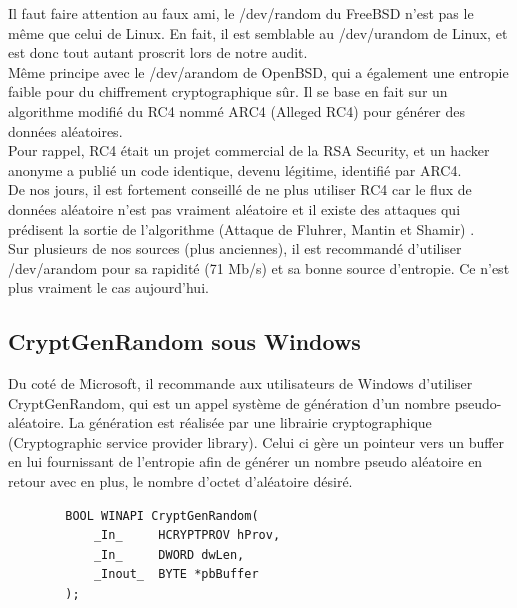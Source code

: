 		Il faut faire attention au faux ami, le /dev/random du FreeBSD n'est pas 
		le même que celui de Linux.
		En fait, il est semblable au /dev/urandom de Linux, et est donc tout 
		autant proscrit lors de notre audit.\\
		
		Même principe avec le /dev/arandom de OpenBSD, qui a également une 
		entropie faible pour du chiffrement cryptographique sûr. Il se base
		en fait sur un algorithme modifié du RC4 nommé ARC4 (Alleged RC4) pour 
		générer des données aléatoires.\\
		Pour rappel, RC4 était un projet commercial de la RSA Security, et un 
		hacker anonyme a publié un code identique, devenu légitime, identifié par
		ARC4.\\
		De nos jours, il est fortement conseillé de ne plus utiliser RC4 car le 
		flux de données aléatoire n’est pas vraiment aléatoire et il existe des 
		attaques qui prédisent la sortie de l’algorithme (Attaque de Fluhrer, 
		Mantin et Shamir) \cite{fmsrc42009}.\\
		Sur plusieurs de nos sources (plus anciennes), il est recommandé
		d'utiliser /dev/arandom pour sa rapidité (71 Mb/s) et sa bonne source
		d'entropie. Ce n'est plus vraiment le cas aujourd'hui.\\
		
		
		
	
	\subsection{CryptGenRandom sous Windows}
	
		Du coté de Microsoft, il recommande aux utilisateurs de Windows 
		d’utiliser CryptGenRandom, qui est un appel système de génération d’un 
		nombre pseudo-aléatoire. La génération est réalisée par une librairie 
		cryptographique (Cryptographic service provider library). Celui ci gère 
		un pointeur vers un buffer en lui fournissant de l’entropie afin de 
		générer un nombre pseudo aléatoire en retour avec en plus, le nombre 
		d’octet d’aléatoire désiré.\\

		\lstset{language=Java}
		\begin{lstlisting}
		BOOL WINAPI CryptGenRandom(
			_In_     HCRYPTPROV hProv,
			_In_     DWORD dwLen,
			_Inout_  BYTE *pbBuffer
		);
		\end{lstlisting}
	
